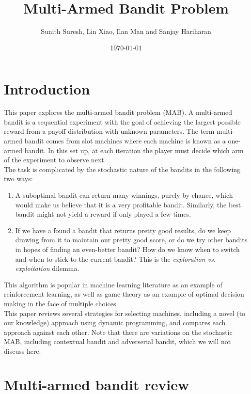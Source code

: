 \documentclass{article}
\title{Multi-Armed Bandit Problem}
\author{Sunith Suresh, Lin Xiao, Ilan Man and Sanjay Hariharan}
\date{\today}
\begin{document}
\maketitle

\section{Introduction}

This paper explores the multi-armed bandit problem (MAB). A multi-armed bandit is a sequential experiment with the goal of achieving the largest possible reward from a payoff distribution with unknown parameters. The term multi-armed bandit comes from slot machines where each machine is known as a one-armed bandit. In this set up, at each iteration the player must decide which arm of the experiment to observe next.\\

The task is complicated by the stochastic nature of the bandits in the following two ways:

\begin{enumerate}
\item A suboptimal bandit can return many winnings, purely by chance, which would make us believe that it is a very profitable bandit. Similarly, the best bandit might not yield a reward if only played a few times.
\item If we have a found a bandit that returns pretty good results, do we keep drawing from it to maintain our pretty good score, or do we try other bandits in hopes of finding an even-better bandit? How do we know when to switch and when to stick to the current bandit? This is the \textit{exploration vs. exploitation} dilemma.
\end{enumerate}

This algorithm is popular in machine learning literature as an example of reinforcement learning, as well as game theory as an example of optimal decision making in the face of multiple choices.\\

This paper reviews several strategies for selecting machines, including a novel (to our knowledge) approach using dynamic programming, and compares each approach against each other. Note that there are variations on the stochastic MAB, including contextual bandit and adverserial bandit, which we will not discuss here.

\section{Multi-armed bandit review}
\end{document}
